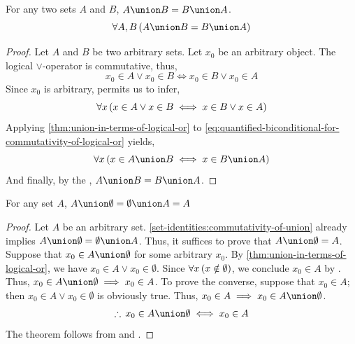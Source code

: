 \begin{thm}[Commutativity]
    \label{set-identities:commutativity-of-union}
    For any two sets \( A \) and \( B \), \( A \union B = B \union A \).
    \begin{equation*}
        \forall A,B \, \mleft( A \union B = B \union A \mright)
    \end{equation*}
\end{thm}

\begin{proof}
    Let \( A \) and \( B \) be two arbitrary sets. Let \( x_{0} \) be an arbitrary object.
    The logical \( \lor \)-operator is commutative, thus,
    \begin{equation*}
        x_{0} \in A \lor x_{0} \in B \iff x_{0} \in B \lor x_{0} \in A
    \end{equation*}
    Since \( x_{0} \) is arbitrary,  permits us to infer,
    \begin{equation}
        \label{eq:quantified-biconditional-for-commutativity-of-logical-or}
        \forall x \, \mleft( x \in A \lor x \in B \iff x \in B \lor x \in A \mright)
    \end{equation}
    Applying \cref{thm:union-in-terms-of-logical-or} to \eqref{eq:quantified-biconditional-for-commutativity-of-logical-or}
    yields,
    \begin{equation*}
        \forall x \, \mleft( x \in A \union B \iff x \in B \union A \mright)
    \end{equation*}
    And finally, by the , \( A \union B = B \union A \).
\end{proof}

\begin{thm}
    \label{set-identities:any-set-union-empty-set-equals-the-set-itself}
    For any set \( A \), \( A \union \emptyset = \emptyset \union A = A \)
\end{thm}

\begin{proof}
    Let \( A \) be an arbitrary set. \cref{set-identities:commutativity-of-union} already implies \( A \union \emptyset = \emptyset \union A \).
    Thus, it suffices to prove that \( A \union \emptyset = A \). Suppose that \( x_{0} \in A \union \emptyset \) for some arbitrary \( x_{0} \). By
    \cref{thm:union-in-terms-of-logical-or}, we have \( x_{0} \in A \lor x_{0} \in \emptyset\). Since \( \forall x \, \mleft( x \notin \emptyset \mright) \),
    we conclude \( x_{0} \in A \) by . Thus, \( x_{0} \in A \union \emptyset \implies x_{0} \in A \). To prove the converse, suppose that
    \( x_{0} \in A \); then \( x_{0} \in A \lor x_{0} \in \emptyset \) is obviously true. Thus, \( x_{0} \in A \implies x_{0} \in A \union \emptyset \).
    \begin{equation*}
        \therefore \, x_{0} \in A \union \emptyset \iff x_{0} \in A
    \end{equation*}
    The theorem follows from  and .
\end{proof}

